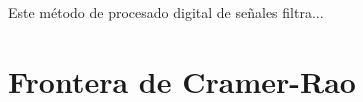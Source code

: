 Este método de procesado digital de señales filtra...






\section{Frontera de Cramer-Rao}
\label{sec:system:conclusion}



